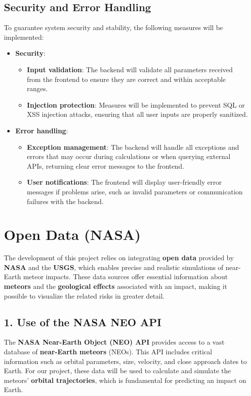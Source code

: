 \documentclass[conference]{IEEEtran}
\begin{document}
\subsection{Security and Error Handling}
To guarantee system security and stability, the following measures will be
implemented:
\begin{itemize}
	\item \textbf{Security}:
	      \begin{itemize}
		      \item \textbf{Input validation}: The backend will validate all
		            parameters received from the frontend to ensure they are correct
		            and within acceptable ranges.
		      \item \textbf{Injection protection}: Measures will be implemented to
		            prevent SQL or XSS injection attacks, ensuring that all user
		            inputs are properly sanitized.
	      \end{itemize}
	\item \textbf{Error handling}:
	      \begin{itemize}
		      \item \textbf{Exception management}: The backend will handle all
		            exceptions and errors that may occur during calculations or when
		            querying external APIs, returning clear error messages to the
		            frontend.
		      \item \textbf{User notifications}: The frontend will display
		            user-friendly error messages if problems arise, such as invalid
		            parameters or communication failures with the backend.
	      \end{itemize}
\end{itemize}


\section{Open Data (NASA)}
The development of this project relies on integrating \textbf{open data}
provided by \textbf{NASA} and the \textbf{USGS}, which enables precise and
realistic simulations of near-Earth meteor impacts. These data sources offer
essential information about \textbf{meteors} and the \textbf{geological
	effects} associated with an impact, making it possible to visualize the related
risks in greater detail.

\subsection{1. Use of the \textbf{NASA NEO API}}
The \textbf{NASA Near-Earth Object (NEO) API} provides access to a vast
database of \textbf{near-Earth meteors} (NEOs). This API includes critical
information such as orbital parameters, size, velocity, and close approach dates
to Earth. For our project, these data will be used to calculate and simulate the
meteors' \textbf{orbital trajectories}, which is fundamental for predicting an
impact on Earth.
\end{document}
